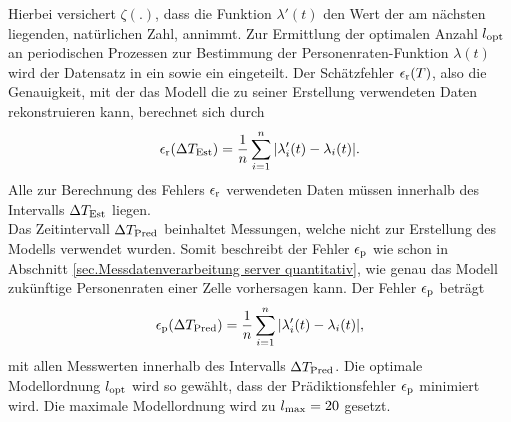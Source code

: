 Hierbei versichert $\zeta (.) $, dass die Funktion $\lambda ' (t)$  den  Wert der am nächsten liegenden, natürlichen Zahl, annimmt. 
Zur Ermittlung der optimalen Anzahl $l_{\mathrm{opt}}$ an periodischen Prozessen zur Bestimmung der Personenraten-Funktion $\lambda (t)$ wird der Datensatz in ein \grqq{} sowie ein \grqq{} eingeteilt. Der Schätzfehler $\epsilon_{\mathrm{r}} (T)$, also die Genauigkeit, mit der das Modell die zu seiner Erstellung verwendeten Daten rekonstruieren kann, berechnet sich durch
\begin{equation}\label{eq:Schätzfehler quantitativ}
	\epsilon_{\mathrm{r}}(\Delta T_{\mathrm{Est}}) = \frac{1}{n} \sum_{i=1}^{n} |\lambda_i '(t) - \lambda_i (t)| .
\end{equation}
Alle zur Berechnung des Fehlers $\epsilon_{\mathrm{r}}$ verwendeten Daten müssen innerhalb des Intervalls $\Delta T_{\mathrm{Est}}$ liegen. \\
Das Zeitintervall $\Delta T_{\mathrm{Pred}}$ beinhaltet Messungen, welche nicht zur Erstellung des Modells verwendet wurden. Somit beschreibt der Fehler $\epsilon_{\mathrm{p}}$ wie schon in Abschnitt \ref{sec.Messdatenverarbeitung server quantitativ}, wie genau das Modell zukünftige Personenraten einer Zelle vorhersagen kann. Der Fehler $\epsilon_{\mathrm{p}}$ beträgt
\begin{equation}\label{eq:Prädiktionsfehler quantitativ}
	\epsilon_{\mathrm{p}}(\Delta T_{\mathrm{Pred}}) = \frac{1}{n} \sum_{i=1}^{n} |\lambda_i '(t) - \lambda_i (t)| ,
\end{equation}
mit allen Messwerten innerhalb des Intervalls $\Delta T_{\mathrm{Pred}}$. Die optimale Modellordnung $l_{\mathrm{opt}}$ wird so gewählt, dass der Prädiktionsfehler $\epsilon_{\mathrm{p}}$ minimiert wird. Die maximale Modellordnung wird zu $l_{\mathrm{max}} = 20$ gesetzt.